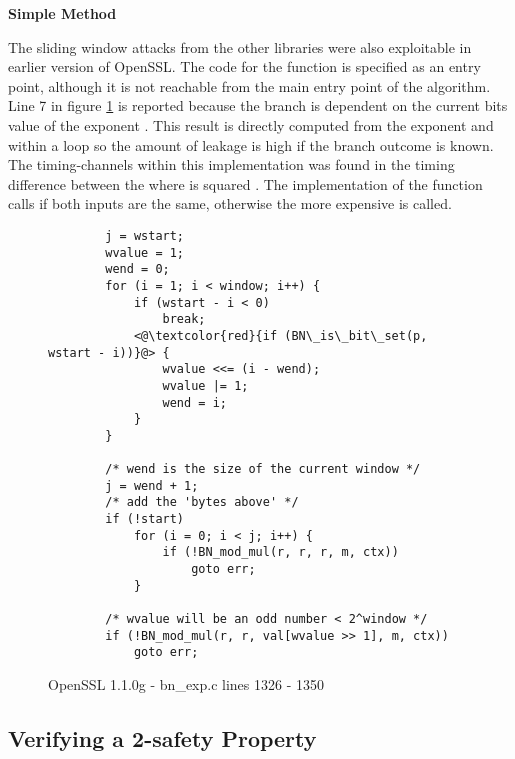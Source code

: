   \noindent
  \textbf{Simple Method}

  The sliding window attacks from the other libraries were also exploitable
  in earlier version of OpenSSL. The code for the function  is
  specified as an entry point, although it is not reachable from the
  main entry point of the algorithm. Line 7 in figure \ref{openssl:simple} is reported
  because the branch is dependent on the current bits value of the exponent
  . This result is directly computed from the exponent and within a
  loop so the amount of leakage is high if the branch outcome is known. The
  timing-channels within this implementation was found in the timing difference
  between the  where  is squared
  \cite{percival2005cache}. The implementation of the 
  function calls  if both inputs are the same, otherwise the
  more expensive  is called.


     \begin{figure}[!htpb]
       \begin{lstlisting}
        j = wstart;
        wvalue = 1;
        wend = 0;
        for (i = 1; i < window; i++) {
            if (wstart - i < 0)
                break;
            <@\textcolor{red}{if (BN\_is\_bit\_set(p, wstart - i))}@> {
                wvalue <<= (i - wend);
                wvalue |= 1;
                wend = i;
            }
        }

        /* wend is the size of the current window */
        j = wend + 1;
        /* add the 'bytes above' */
        if (!start)
            for (i = 0; i < j; i++) {
                if (!BN_mod_mul(r, r, r, m, ctx))
                    goto err;
            }

        /* wvalue will be an odd number < 2^window */
        if (!BN_mod_mul(r, r, val[wvalue >> 1], m, ctx))
            goto err;
       \end{lstlisting}
       \caption{OpenSSL 1.1.0g - bn\_exp.c lines 1326 - 1350}
       \label{openssl:simple}
     \end{figure}

\subsection{Verifying a 2-safety Property}

